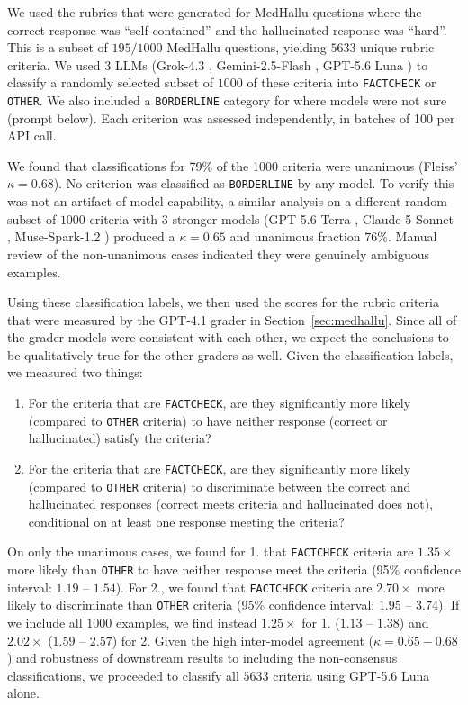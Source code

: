 \documentclass{article}
\begin{document}
We used the rubrics that were generated for MedHallu questions where the correct response was ``self-contained'' and the hallucinated response was ``hard''. This is a subset of $195/1000$ MedHallu questions, yielding $5633$ unique rubric criteria. We used 3 LLMs (Grok-4.3 \citep{xAI2026Grok43}, Gemini-2.5-Flash \citep{Google2025Gemini25Flash}, GPT-5.6 Luna \citep{OpenAI2026GPT56}) to classify a randomly selected subset of $1000$ of these criteria into \texttt{FACTCHECK} or \texttt{OTHER}. We also included a \texttt{BORDERLINE} category for where models were not sure (prompt below). Each criterion was assessed independently, in batches of 100 per API call. 

We found that classifications for 79\% of the 1000 criteria were unanimous (Fleiss' $\kappa=0.68$). No criterion was classified as \texttt{BORDERLINE} by any model. To verify this was not an artifact of model capability, a similar analysis on a different random subset of $1000$ criteria with 3 stronger models (GPT-5.6 Terra \citep{OpenAI2026GPT56}, Claude-5-Sonnet \citep{Anthropic2026Sonnet5}, Muse-Spark-1.2 \citep{Meta2026MuseSpark12}) produced a $\kappa = 0.65$ and unanimous fraction $76\%$. Manual review of the non-unanimous cases indicated they were genuinely ambiguous examples.

Using these classification labels, we then used the scores for the rubric criteria that were measured by the GPT-4.1 grader in Section~\ref{sec:medhallu}. Since all of the grader models were consistent with each other, we expect the conclusions to be qualitatively true for the other graders as well. Given the classification labels, we measured two things:
\begin{enumerate}
    \item For the criteria that are \texttt{FACTCHECK}, are they significantly more likely (compared to \texttt{OTHER} criteria) to have neither response (correct or hallucinated) satisfy the criteria?
    \item For the criteria that are \texttt{FACTCHECK}, are they significantly more likely (compared to \texttt{OTHER} criteria) to discriminate between the correct and hallucinated responses (correct meets criteria and hallucinated does not), conditional on at least one response meeting the criteria?
\end{enumerate}
On only the unanimous cases, we found for 1. that \texttt{FACTCHECK} criteria are $1.35\times$ more likely than \texttt{OTHER} to have neither response meet the criteria (95\% confidence interval: $1.19$ -- $1.54$). For 2., we found that \texttt{FACTCHECK} criteria are $2.70\times$ more likely to discriminate than \texttt{OTHER} criteria (95\% confidence interval: $1.95$ -- $3.74$). If we include all $1000$ examples, we find instead $1.25\times$ for 1. ($1.13$ -- $1.38$) and $2.02\times$ ($1.59$ -- $2.57$) for 2. Given the high inter-model agreement ($\kappa = 0.65 - 0.68$) and robustness of downstream results to including the non-consensus classifications, we proceeded to classify all $5633$ criteria using GPT-5.6 Luna alone.
\end{document}
